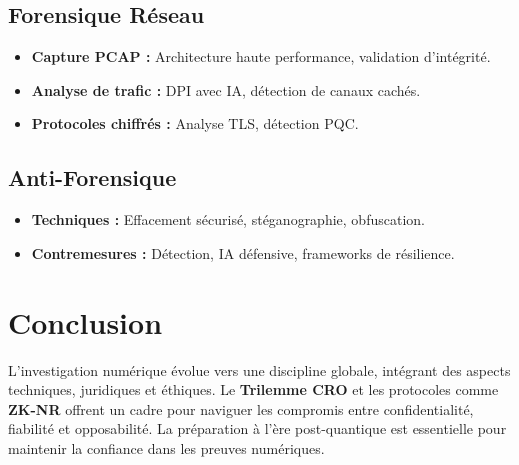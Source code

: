 \documentclass[12pt]{article}
\begin{document}
\subsection{Forensique Réseau}

\begin{itemize}
    \item \textbf{Capture PCAP :} Architecture haute performance, validation d'intégrité.
    \item \textbf{Analyse de trafic :} DPI avec IA, détection de canaux cachés.
    \item \textbf{Protocoles chiffrés :} Analyse TLS, détection PQC.
\end{itemize}

\subsection{Anti-Forensique}

\begin{itemize}
    \item \textbf{Techniques :} Effacement sécurisé, stéganographie, obfuscation.
    \item \textbf{Contremesures :} Détection, IA défensive, frameworks de résilience.
\end{itemize}

\section{Conclusion}

L'investigation numérique évolue vers une discipline globale, intégrant des aspects techniques, juridiques et éthiques. Le \textbf{Trilemme CRO} et les protocoles comme \textbf{ZK-NR} offrent un cadre pour naviguer les compromis entre confidentialité, fiabilité et opposabilité. La préparation à l'ère post-quantique est essentielle pour maintenir la confiance dans les preuves numériques.

\vspace{1cm}
\end{document}

